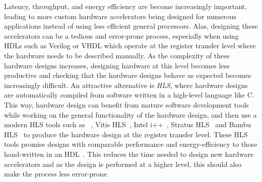 
Latency, throughput, and energy efficiency are become increasingly important,
leading to more custom hardware accelerators being designed for numerous
applications instead of using less efficient general processors.  Alas,
designing these accelerators can be a tedious and error-prone process,
especially when using \glspl{HDL} such as Verilog or VHDL which operate at the
register transfer level where the hardware needs to be described manually.  As
the complexity of these hardware designs increases, designing hardware at this
level becomes less productive and checking that the hardware designs behave as
expected becomes increasingly difficult.  An attractive alternative is
\emph{\gls{HLS}}, where hardware designs are automatically compiled from
software written in a high-level language like C.  This way, hardware design can
benefit from mature software development tools while working on the general
functionality of the hardware design, and then use a modern \gls{HLS} tools such
as \legup{}~\cite{canis11_legup}, Vitis HLS~\cite{amd23_vitis_high_synth}, Intel
i++~\cite{intel_hls}, Stratus HLS~\cite{roane23_autom_hw_sw_co_desig} and Bambu
HLS~\cite{bambu_hls} to produce the hardware design at the register transfer
level.  These \gls{HLS} tools promise designs with comparable performance and
energy-efficiency to those hand-written in an \gls{HDL}~\cite{homsirikamol+14,
  silexicahlshdl, 7818341}.  This reduces the time needed to design new hardware
accelerators and as the design is performed at a higher level, this should also
make the process less error-prone.

